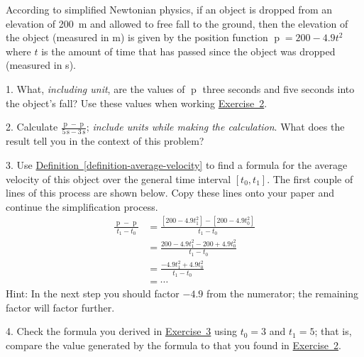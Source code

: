 \documentclass[12pt,]{book}
\theoremstyle{plain}
\theoremstyle{definition}
\numberwithin{equation}{section}
\providecommand\phantomsection{}
\newcommand{\fe}[2]{\mathop{{#1}{\left(#2\right)}}}
\newcommand{\cinterval}[2]{\left[#1,#2\right]}
\begin{document}
According to simplified Newtonian physics, if an object is dropped from an elevation of \SI{200}{\meter} and allowed to free fall to the ground, then the elevation of the object (measured in \si{\meter}) is given by the position function \(\fe{p}{t}=200-4.9t^2\) where \(t\) is the amount of time that has passed since the object was dropped (measured in \si{\second}).%
\begin{exerciselist}
\item[1.]\phantomsection\hypertarget{exercise-1}{\null}What, \emph{including unit}, are the values of \(\fe{p}{t}\) three seconds and five seconds into the object's fall? Use these values when working \hyperref[exercise-average-velocity]{Exercise~2}.%
\par\smallskip
\item[2.]\phantomsection\hypertarget{exercise-average-velocity}{\null}Calculate \(\frac{\fe{p}{5\,\text{s}}-\fe{p}{3\,\text{s}}}{{5\,\text{s}}-{3\,\text{s}}}\); \emph{include units while making the calculation}. What does the result tell you in the context of this problem?%
\par\smallskip
\item[3.]\phantomsection\hypertarget{exercise-average-velocity-formula}{\null}Use \hyperref[definition-average-velocity]{Definition~\ref*{definition-average-velocity}} to find a formula for the average velocity of this object over the general time interval \(\cinterval{t_0}{t_1}\). The first couple of lines of this process are shown below. Copy these lines onto your paper and continue the simplification process.\begin{align*}
\frac{\fe{p}{t_1}-\fe{p}{t_0}}{t_1-t_0}&=\frac{\left[200-4.9t_1^2\right]-\left[200-4.9t_0^2\right]}{t_1-t_0}\\
&=\frac{200-4.9t_1^2-200+4.9t_0^2}{t_1-t_0}\\
&=\frac{-4.9t_1^2+4.9t_0^2}{t_1-t_0}\\
&=\cdots
\end{align*}
                Hint: In the next step you should factor \(-4.9\) from the numerator; the remaining factor will factor further.%
\par\smallskip
\item[4.]\phantomsection\hypertarget{exercise-4}{\null}Check the formula you derived in \hyperref[exercise-average-velocity-formula]{Exercise~3} using \(t_0=3\) and \(t_1=5\); that is, compare the value generated by the formula to that you found in \hyperref[exercise-average-velocity]{Exercise~2}.%
\par\smallskip

\end{exerciselist}
\end{document}
